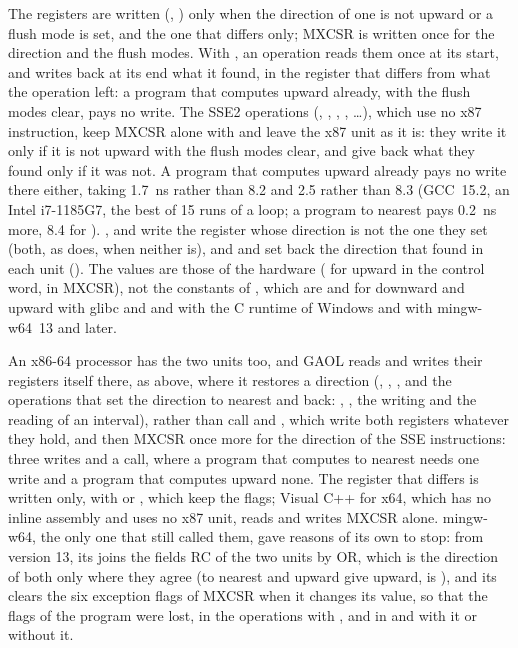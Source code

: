 \documentclass[12pt,a4paper,twoside,openright]{book}
\begin{document}
\medskip
The registers are written (, ) only when the
direction of one is not upward or a flush mode is set, and the one that
differs only; MXCSR is written once for the direction and the flush modes.
With , an operation reads them once at its
start, and writes back at its end what it found, in the register that differs
from what the operation left: a program that computes upward already, with
the flush modes clear, pays no write. The SSE2 operations (\code{+},
\code{-}, \code{*}, \code{/}, \ldots), which use no x87
instruction, keep MXCSR alone with  and leave
the x87 unit as it is: they write it only if it is not upward with the flush
modes clear, and give back what they found only if it was
not.\newinvfive{} A program that computes upward already pays no write there
either,  taking 1.7~ns rather than 8.2 and  2.5
rather than 8.3 (GCC~15.2, an Intel i7-1185G7, the best of 15 runs of a
loop; a program to nearest pays 0.2~ns more, 8.4 for ).
,  and 
write the register whose direction is not the one they set (both, as
 does, when neither is), and  and
 set back the direction that  found in
each unit (). The values are those of the hardware
( for upward in the control word,  in MXCSR), not
the  constants of , which are  and
 for downward and upward with glibc and  and
 with the C runtime of Windows and with mingw-w64~13 and later.

\medskip
An x86-64 processor has the two units too, and GAOL reads and writes their
registers itself there, as above, where it restores a direction
(, ,
, and the operations that set the direction to
nearest and back: , , the writing and the
reading of an interval), rather than call  and
,\newinvfive{} which write both registers whatever they
hold, and then MXCSR once more for the direction of the SSE instructions:
three writes and a call, where a program that computes to nearest needs one
write and a program that computes upward none. The register that differs is
written only, with  or , which keep the flags;
Visual C++ for x64, which has no inline assembly and uses no x87 unit, reads
and writes MXCSR alone. mingw-w64, the only one that still called them, gave
reasons of its own to stop: from version 13, its  joins the
fields RC of the two units by OR, which is the direction of both only where
they agree (to nearest and upward give upward,
 is ), and its
 clears the six exception flags of MXCSR when it changes
its value, so that the flags of the program were lost, in the operations with
, and in  and
 with it or without it.
\end{document}
